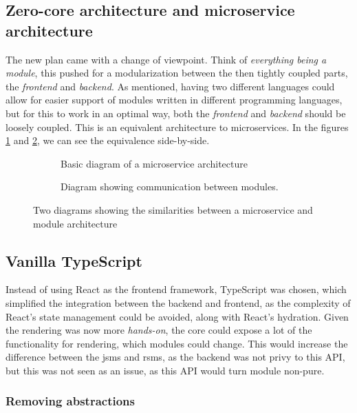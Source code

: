 \subsection{Zero-core architecture and microservice architecture}

The new plan came with a change of viewpoint. Think of
\textit{everything being a module}, this pushed for a modularization between the
then tightly coupled parts, the \textit{frontend} and \textit{backend}. As
mentioned, having two different languages could allow for easier support of
modules written in different programming languages, but for this to work in an
optimal way, both the \textit{frontend} and \textit{backend} should be loosely
coupled. This is an equivalent architecture to microservices. In the figures
\ref{sfig:mic} and \ref{sfig:mod}, we can see the equivalence side-by-side.

\begin{figure}[H]
  \begin{subfigure}[h]{0.49\linewidth}
    
    \caption{Basic diagram of a microservice architecture}
    \label{sfig:mic}
  \end{subfigure}
  \hfill
  \begin{subfigure}[h]{0.49\linewidth}
    
    \caption{
      Diagram showing communication between modules.
    }
    \label{sfig:mod}
  \end{subfigure}
  \caption{
    Two diagrams showing the similarities between a microservice and module
    architecture
  }
  \label{fig:comp}
\end{figure}


\subsection{Vanilla TypeScript}

Instead of using React as the frontend framework, TypeScript was chosen, which
simplified the integration between the backend and frontend, as the complexity
of React's state management could be avoided, along with React's hydration.
Given the rendering was now more \textit{hands-on}, the core could expose a lot
of the functionality for rendering, which modules could change. This would
increase the difference between the \gls*{jsms} and \gls*{rsms}, as the backend
was not privy to this API, but this was not seen as an issue, as this API would
turn module non-pure.

\subsubsection{Removing abstractions}

